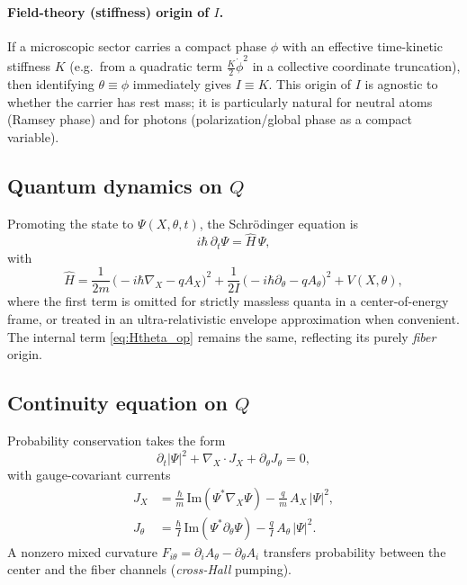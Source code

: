 \paragraph{Field-theory (stiffness) origin of $I$.}
If a microscopic sector carries a compact phase $\phi$ with an effective time-kinetic stiffness $K$
(e.g.\ from a quadratic term $\tfrac{K}{2}\dot\phi^2$ in a collective coordinate truncation), then identifying
$\theta\equiv \phi$ immediately gives $I\equiv K$. This origin of $I$ is agnostic to whether the carrier
has rest mass; it is particularly natural for neutral atoms (Ramsey phase) and for photons
(polarization/global phase as a compact variable).

\subsection{\texorpdfstring{Quantum dynamics on $Q$}{Quantum dynamics on Q}}
Promoting the state to $\Psi(X,\theta,t)$, the Schrödinger equation is
\begin{equation}
i\hbar\,\partial_t \Psi=\hat H\,\Psi,
\end{equation}
with
\begin{equation}
\hat H=\frac{1}{2m}\,\big(-i\hbar\nabla_X-qA_X\big)^2
      +\frac{1}{2I}\,\big(-i\hbar\partial_\theta-qA_\theta\big)^2
      +V(X,\theta),
\label{eq:full_H}
\end{equation}
where the first term is omitted for strictly massless quanta in a center-of-energy frame, or treated in an
ultra-relativistic envelope approximation when convenient. The internal term
\eqref{eq:Htheta_op} remains the same, reflecting its purely \emph{fiber} origin.

\subsection{\texorpdfstring{Continuity equation on $Q$}{Continuity equation on Q}}
Probability conservation takes the form
\begin{equation}
\partial_t|\Psi|^2+\nabla_X\!\cdot J_X+\partial_\theta J_\theta=0,
\end{equation}
with gauge-covariant currents
\begin{align}
J_X&=\frac{\hbar}{m}\,\text{Im}(\Psi^\ast\nabla_X\Psi)-\frac{q}{m}\,A_X\,|\Psi|^2,\\
J_\theta&=\frac{\hbar}{I}\,\text{Im}(\Psi^\ast\partial_\theta\Psi)-\frac{q}{I}\,A_\theta\,|\Psi|^2.
\end{align}
A nonzero mixed curvature $F_{i\theta}=\partial_iA_\theta-\partial_\theta A_i$ transfers probability between the
center and the fiber channels (\emph{cross-Hall} pumping).

